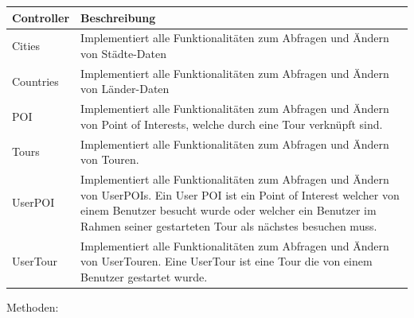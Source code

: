 \documentclass[a4paper,10pt,xetex]{article}
\begin{document}
\begin{longtabu} to \textwidth { | l | X[l] | }
\hline
\textbf{Controller} & \textbf{Beschreibung} \\
\hline
\endhead

Cities & Implementiert alle Funktionalit\"aten zum Abfragen und \"Andern von
  St\"adte-Daten\\ \hline
Countries & Implementiert alle Funktionalit\"aten zum Abfragen und \"Andern von
  L\"ander-Daten\\ \hline
POI & Implementiert alle Funktionalit\"aten zum Abfragen und \"Andern von Point of
Interests, welche durch eine Tour verkn\"upft sind.\\\hline
Tours & Implementiert alle Funktionalit\"aten zum Abfragen und \"Andern von Touren.\\\hline
UserPOI & Implementiert alle Funktionalit\"aten zum Abfragen und \"Andern von UserPOIs.
  Ein User POI ist ein Point of Interest welcher von einem Benutzer besucht wurde oder
  welcher ein Benutzer im Rahmen seiner gestarteten Tour als n\"achstes besuchen muss.\\\hline
UserTour & Implementiert alle Funktionalit\"aten zum Abfragen und \"Andern von UserTouren.
  Eine UserTour ist eine Tour die von einem Benutzer gestartet wurde.\\\hline
\end{longtabu}

Methoden:
\end{document}
